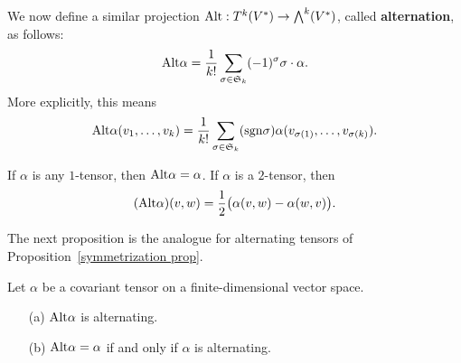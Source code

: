 We now define a similar projection $\mathrm{Alt}:T^k(V^*)\to\bigwedge^k(V^*)$, called \textbf{alternation}, as follows:
\[\mathrm{Alt}\alpha=\frac{1}{k!}\sum_{\sigma\in\mathfrak{S}_k}(-1)^\sigma\sigma\cdot\alpha.\]
More explicitly, this means
\[\mathrm{Alt}\alpha(v_1,\dots,v_k)=\frac{1}{k!}\sum_{\sigma\in\mathfrak{S}_k}(\mathrm{sgn}\sigma)\alpha(v_{\sigma(1)},\dots,v_{\sigma(k)}).\]
\begin{example}
If $\alpha$ is any $1$-tensor, then $\mathrm{Alt}\alpha=\alpha$. If $\alpha$ is a $2$-tensor, then
\[(\mathrm{Alt}\alpha)(v,w)=\frac{1}{2}\big(\alpha(v,w)-\alpha(w,v)\big).\]
\end{example}
The next proposition is the analogue for alternating tensors of Proposition~\ref{symmetrization prop}.
\begin{proposition}
Let $\alpha$ be a covariant tensor on a finite-dimensional vector space.
\begin{itemize}
\item[(a)] $\mathrm{Alt}\alpha$ is alternating.
\item[(b)] $\mathrm{Alt}\alpha=\alpha$ if and only if $\alpha$ is alternating.
\end{itemize}
\end{proposition}
